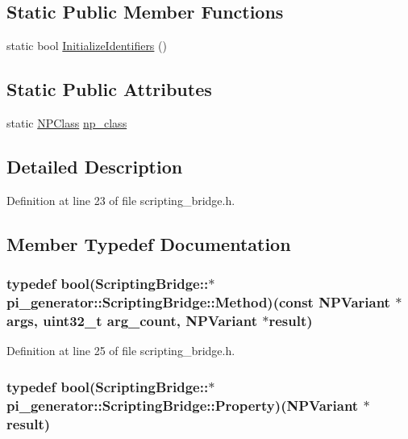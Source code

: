 \subsection*{Static Public Member Functions}
\begin{DoxyCompactItemize}
\item 
static bool \hyperlink{classpi__generator_1_1_scripting_bridge_a76184c7bc22d728d207e275b5f980d67}{InitializeIdentifiers} ()
\end{DoxyCompactItemize}
\subsection*{Static Public Attributes}
\begin{DoxyCompactItemize}
\item 
static \hyperlink{struct_n_p_class}{NPClass} \hyperlink{classpi__generator_1_1_scripting_bridge_a1756e8dff7625cda7697f3e9725ede25}{np\_\-class}
\end{DoxyCompactItemize}


\subsection{Detailed Description}


Definition at line 23 of file scripting\_\-bridge.h.



\subsection{Member Typedef Documentation}
\hypertarget{classpi__generator_1_1_scripting_bridge_a48f5f7b0dfb3daabcdbfb3f7b667fd39}{
\subsubsection[{Method}]{\setlength{\rightskip}{0pt plus 5cm}typedef bool(ScriptingBridge::$\ast$ {\bf pi\_\-generator::ScriptingBridge::Method})(const {\bf NPVariant} $\ast$args, uint32\_\-t arg\_\-count, {\bf NPVariant} $\ast$result)}}
\label{classpi__generator_1_1_scripting_bridge_a48f5f7b0dfb3daabcdbfb3f7b667fd39}


Definition at line 25 of file scripting\_\-bridge.h.

\hypertarget{classpi__generator_1_1_scripting_bridge_abcd8cffa7f26f348e68cde316038245f}{
\subsubsection[{Property}]{\setlength{\rightskip}{0pt plus 5cm}typedef bool(ScriptingBridge::$\ast$ {\bf pi\_\-generator::ScriptingBridge::Property})({\bf NPVariant} $\ast$result)}}
\label{classpi__generator_1_1_scripting_bridge_abcd8cffa7f26f348e68cde316038245f}


